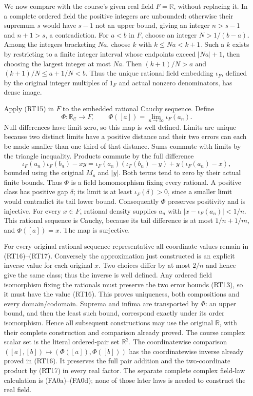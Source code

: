 \documentclass[
  11pt,
]{article}
\begin{document}
We now compare with the course's given real field \(F=\mathbb R\),
without replacing it. In a complete ordered field the positive integers
are unbounded: otherwise their supremum \(s\) would have \(s-1\) not an
upper bound, giving an integer \(n>s-1\) and \(n+1>s\), a contradiction.
For \(a<b\) in \(F\), choose an integer \(N>1/(b-a)\). Among the
integers bracketing \(Na\), choose \(k\) with \(k\le Na<k+1\). Such a
\(k\) exists by restricting to a finite integer interval whose endpoints
exceed \(|Na|+1\), then choosing the largest integer at most \(Na\).
Then \((k+1)/N>a\) and \((k+1)/N\le a+1/N<b\). Thus the unique rational
field embedding \(\iota_F\), defined by the original integer multiples
of \(1_F\) and actual nonzero denominators, has dense image.

Apply (RT15) in \(F\) to the embedded rational Cauchy sequence. Define
\[
\Phi:\mathbb R_{\mathcal C}\longrightarrow F,\qquad
\Phi([a])=\lim_{n\to\infty}\iota_F(a_n).
\tag{RT16}
\] Null differences have limit zero, so this map is well defined. Limits
are unique because two distinct limits have a positive distance and
their two errors can each be made smaller than one third of that
distance. Sums commute with limits by the triangle inequality. Products
commute by the full difference \[
\iota_F(a_n)\iota_F(b_n)-xy
=\iota_F(a_n)(\iota_F(b_n)-y)+y(\iota_F(a_n)-x),
\tag{RT17}
\] bounded using the original \(M_a\) and \(|y|\). Both terms tend to
zero by their actual finite bounds. Thus \(\Phi\) is a field
homomorphism fixing every rational. A positive class has positive gap
\(\delta\); its limit is at least \(\iota_F(\delta)>0\), since a smaller
limit would contradict its tail lower bound. Consequently \(\Phi\)
preserves positivity and is injective. For every \(x\in F\), rational
density supplies \(a_n\) with \(|x-\iota_F(a_n)|<1/n\). This rational
sequence is Cauchy, because its tail difference is at most \(1/n+1/m\),
and \(\Phi([a])=x\). The map is surjective.

For every original rational sequence representative all coordinate
values remain in (RT16)--(RT17). Conversely the approximation just
constructed is an explicit inverse value for each original \(x\). Two
choices differ by at most \(2/n\) and hence give the same class; thus
the inverse is well defined. Any ordered field isomorphism fixing the
rationals must preserve the two error bounds (RT13), so it must have the
value (RT16). This proves uniqueness, both compositions and every
domain/codomain. Suprema and infima are transported by \(\Phi\): an
upper bound, and then the least such bound, correspond exactly under its
order isomorphism. Hence all subsequent constructions may use the
original \(\mathbb R\), with their complete construction and comparison
already proved. The course complex scalar set is the literal
ordered-pair set \(\mathbb R^2\). The coordinatewise comparison
\(([a],[b])\mapsto(\Phi([a]),\Phi([b]))\) has the coordinatewise inverse
already proved in (RT16). It preserves the full pair addition and the
two-coordinate product by (RT17) in every real factor. The separate
complete complex field-law calculation is (FA0a)--(FA0d); none of those
later laws is needed to construct the real field.
\end{document}
